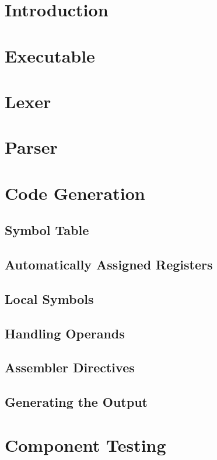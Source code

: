 \documentclass[a4paper,11pt]{report}
\begin{document}
\section{Introduction}
\section{Executable}
\section{Lexer}
\section{Parser}
\section{Code Generation}
\subsection{Symbol Table}
\subsection{Automatically Assigned Registers}
\subsection{Local Symbols}
\subsection{Handling Operands}
\subsection{Assembler Directives}
\subsection{Generating the Output}
\section{Component Testing}
\end{document}

